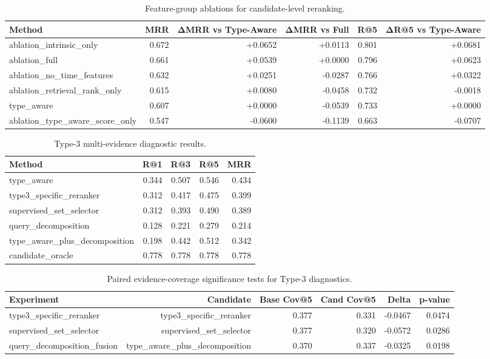 \begin{table}[t]
\centering
\caption{Feature-group ablations for candidate-level reranking.}
\label{tab:candidate_reranker_feature_ablation}
\begin{tabular}{lrrrrr}
\toprule
Method & MRR & ΔMRR vs Type-Aware & ΔMRR vs Full & R@5 & ΔR@5 vs Type-Aware \\
\midrule
ablation\_intrinsic\_only & 0.672 & +0.0652 & +0.0113 & 0.801 & +0.0681 \\
ablation\_full & 0.661 & +0.0539 & +0.0000 & 0.796 & +0.0623 \\
ablation\_no\_time\_features & 0.632 & +0.0251 & -0.0287 & 0.766 & +0.0322 \\
ablation\_retrieval\_rank\_only & 0.615 & +0.0080 & -0.0458 & 0.732 & -0.0018 \\
type\_aware & 0.607 & +0.0000 & -0.0539 & 0.733 & +0.0000 \\
ablation\_type\_aware\_score\_only & 0.547 & -0.0600 & -0.1139 & 0.663 & -0.0707 \\
\bottomrule
\end{tabular}
\end{table}

\begin{table}[t]
\centering
\caption{Type-3 multi-evidence diagnostic results.}
\label{tab:type3_boundary}
\begin{tabular}{lrrrr}
\toprule
Method & R@1 & R@3 & R@5 & MRR \\
\midrule
type\_aware & 0.344 & 0.507 & 0.546 & 0.434 \\
type3\_specific\_reranker & 0.312 & 0.417 & 0.475 & 0.399 \\
supervised\_set\_selector & 0.312 & 0.393 & 0.490 & 0.389 \\
query\_decomposition & 0.128 & 0.221 & 0.279 & 0.214 \\
type\_aware\_plus\_decomposition & 0.198 & 0.442 & 0.512 & 0.342 \\
candidate\_oracle & 0.778 & 0.778 & 0.778 & 0.778 \\
\bottomrule
\end{tabular}
\end{table}

\begin{table}[t]
\centering
\caption{Paired evidence-coverage significance tests for Type-3 diagnostics.}
\label{tab:type3_coverage_sig}
\begin{tabular}{lrrrrr}
\toprule
Experiment & Candidate & Base Cov@5 & Cand Cov@5 & Delta & p-value \\
\midrule
type3\_specific\_reranker & type3\_specific\_reranker & 0.377 & 0.331 & -0.0467 & 0.0474 \\
supervised\_set\_selector & supervised\_set\_selector & 0.377 & 0.320 & -0.0572 & 0.0286 \\
query\_decomposition\_fusion & type\_aware\_plus\_decomposition & 0.370 & 0.337 & -0.0325 & 0.0198 \\
\bottomrule
\end{tabular}
\end{table}

